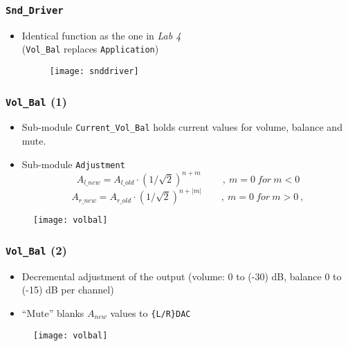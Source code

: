 \begin{frame}
  \frametitle{\texttt{Snd\_Driver}}
    \begin{itemize}
      \item Identical function as the one in \emph{Lab 4}\\ (\texttt{Vol\_Bal} replaces \texttt{Application})
        \begin{figure}
          \centering
          \texttt{[image: snddriver]}
        \end{figure}
    \end{itemize}
\end{frame}

\begin{frame}
  \frametitle{\texttt{Vol\_Bal} (1)}
    \begin{itemize}
      \item Sub-module \texttt{Current\_Vol\_Bal} holds current values for volume, balance and mute.
      \item Sub-module \texttt{Adjustment} $$A_{l\_new} = A_{l\_old} \cdot (1/\sqrt{2})^{n + m}\qquad\ ,\ m = 0\ for\ m < 0$$
$$A_{r\_new} = A_{r\_old} \cdot (1/\sqrt{2})^{n + |m|}\qquad,\ m = 0\ for\ m > 0\ ,$$
    \end{itemize}
    \begin{figure}
      \centering
      \texttt{[image: volbal]}
    \end{figure}
\end{frame}


\begin{frame}
  \frametitle{\texttt{Vol\_Bal} (2)}
    \begin{itemize}
      \item Decremental adjustment of the output (volume: 0 to (-30) dB, balance 0 to (-15) dB per channel)
      \item ``Mute'' blanks $A_{new}$ values to \texttt{\{L/R\}DAC}
    \end{itemize}
    \begin{figure}
      \centering
      \texttt{[image: volbal]}
    \end{figure}
\end{frame}


